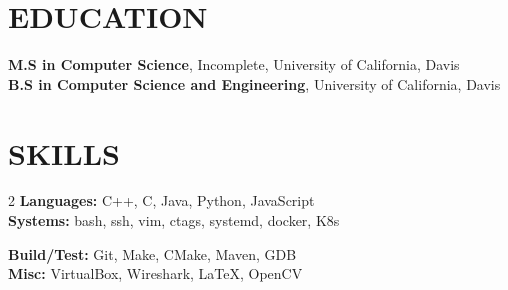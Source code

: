 \documentclass[letterpaper, 10pt, centered]{res} %
\begin{document}
\begin{resume}
\section{EDUCATION}
\textbf{M.S in Computer Science}, Incomplete,  University of California, Davis \\
\textbf{B.S in Computer Science and Engineering}, University of California, Davis
\vspace{-6pt}

\section{SKILLS}
\vspace{0pt}
\begin{multicols}{2}
	\textbf{Languages:} C++, C, Java, Python, JavaScript \\
	\textbf{Systems:} bash, ssh, vim, ctags, systemd, docker, K8s \\
	
	\columnbreak
	
	\textbf{Build/Test:} Git, Make, CMake, Maven, GDB \\
	\textbf{Misc:} VirtualBox, Wireshark, LaTeX, OpenCV \\
\end{multicols}

\end{resume}
\end{document}
